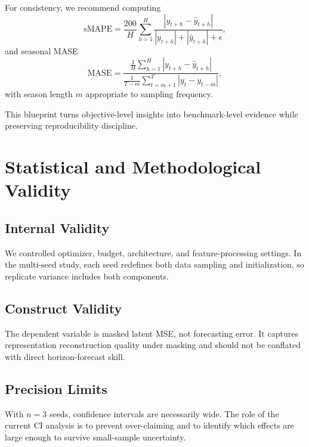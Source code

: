 \documentclass[conference]{IEEEtran}
\begin{document}
For consistency, we recommend computing
\begin{equation}
\mathrm{sMAPE} = \frac{200}{H}\sum_{h=1}^{H}
\frac{|y_{t+h}-\hat{y}_{t+h}|}{|y_{t+h}| + |\hat{y}_{t+h}| + \epsilon},
\label{eq:smape}
\end{equation}
and seasonal MASE
\begin{equation}
\mathrm{MASE} =
\frac{\frac{1}{H}\sum_{h=1}^{H}|y_{t+h}-\hat{y}_{t+h}|}
{\frac{1}{T-m}\sum_{t=m+1}^{T}|y_t-y_{t-m}|},
\label{eq:mase}
\end{equation}
with season length $m$ appropriate to sampling frequency.

This blueprint turns objective-level insights into benchmark-level evidence while preserving reproducibility discipline.

\section{Statistical and Methodological Validity}
\subsection{Internal Validity}
We controlled optimizer, budget, architecture, and feature-processing settings. In the multi-seed study, each seed redefines both data sampling and initialization, so replicate variance includes both components.

\subsection{Construct Validity}
The dependent variable is masked latent MSE, not forecasting error. It captures representation reconstruction quality under masking and should not be conflated with direct horizon-forecast skill.

\subsection{Precision Limits}
With $n=3$ seeds, confidence intervals are necessarily wide. The role of the current CI analysis is to prevent over-claiming and to identify which effects are large enough to survive small-sample uncertainty.
\end{document}
